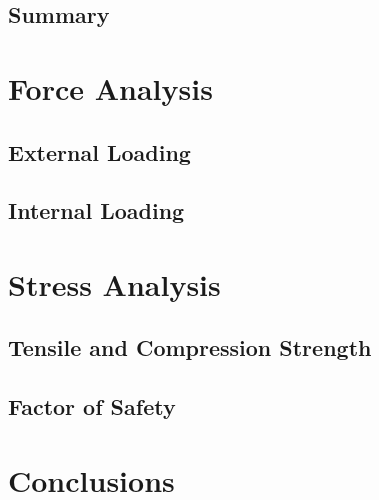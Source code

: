 \documentclass[]{article}
\begin{document}
\subsection{Summary}

\section{Force Analysis}
\subsection{External Loading}

\subsection{Internal Loading}

\section{Stress Analysis}
\subsection{Tensile and Compression Strength}
\subsection{Factor of Safety}

\section{Conclusions}

\newpage
\newrefcontext[sorting=nyt]
\printbibliography
\end{document}
